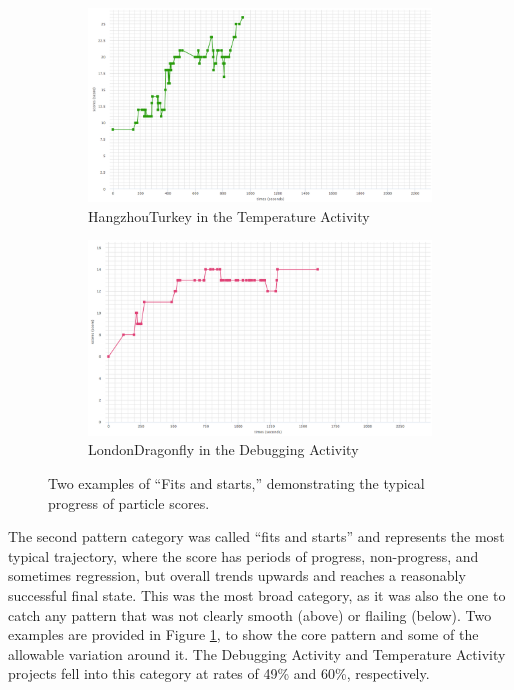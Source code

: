 \begin{figure}
	\centering
	\begin{subfigure}{\textwidth}
		\includegraphics[width=\textwidth]{images/stories/scores-temp-HangzhouTurkey}
		\caption{HangzhouTurkey in the Temperature Activity}
	\end{subfigure}\hfill
	\begin{subfigure}{\textwidth}
		\includegraphics[width=\textwidth]{images/stories/scores-debug-LondonDragonfly}
		\caption{LondonDragonfly in the Debugging Activity}
	\end{subfigure}\hfill
	\caption[``Fits and Starts,'' Typical Progress of Particle Scores]{Two examples of ``Fits and starts,'' demonstrating the typical progress of particle scores.}
	\label{fig:fits_starts_chart}
\end{figure}
The second pattern category was called ``fits and starts'' and represents the most typical trajectory, where the score has periods of progress, non-progress, and sometimes regression, but overall trends upwards and reaches a reasonably successful final state. This was the most broad category, as it was also the one to catch any pattern that was not clearly smooth (above) or flailing (below). Two examples are provided in Figure \ref{fig:fits_starts_chart}, to show the core pattern and some of the allowable variation around it. The Debugging Activity and Temperature Activity projects fell into this category at rates of 49\% and 60\%, respectively. 


